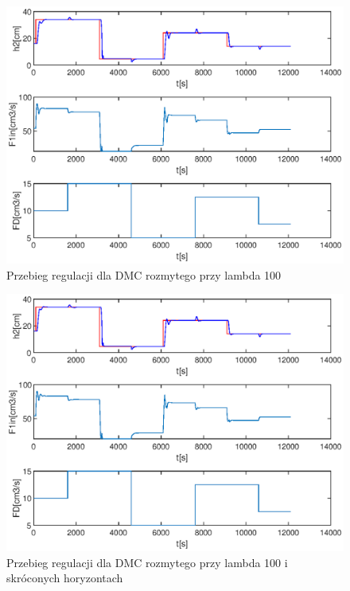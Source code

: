 		\begin{figure}[h!]
			\includegraphics[width=0.9\linewidth]{plots/z2_dmc100.eps}
			\caption{Przebieg regulacji dla DMC rozmytego przy lambda 100}
			\label{rys:dmcroz100}
		\end{figure}
		\begin{figure}[h!]
			\includegraphics[width=0.9\linewidth]{plots/z2_dmchor.eps}
			\caption{Przebieg regulacji dla DMC rozmytego przy lambda 100 i skróconych horyzontach}
			\label{rys:dmcroz100hor}
		\end{figure}
		